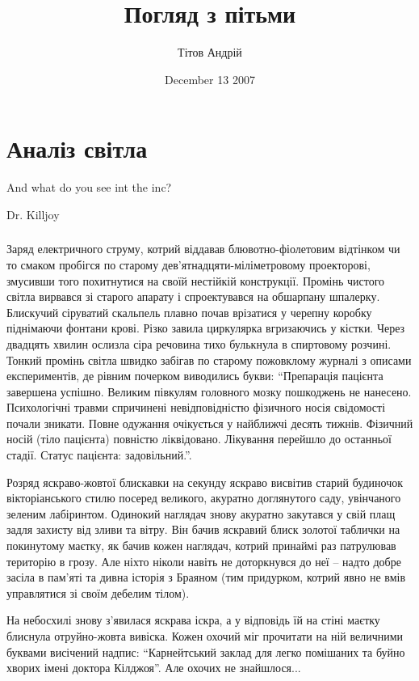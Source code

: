 \documentclass[a4paper,oneside]{book}
\begin{document}
\title{Погляд з пітьми}
\author{Тітов Андрій}
\date{December 13 2007}
\maketitle

\tableofcontents

\part{Аналіз світла}
\setcounter{chapter}{1}

\epigraph{And what do you see int the inc?}{Dr. Killjoy}

\section*{}

Заряд електричного струму, котрий віддавав блювотно-фіолетовим відтінком чи то
смаком пробігся по старому дев'ятнадцяти-міліметровому проекторові, змусивши
того похитнутися на своїй нестійкій конструкції. Промінь чистого світла
вирвався зі старого апарату і спроектувався  на обшарпану шпалерку. Блискучий
сіруватий скальпель плавно почав врізатися у черепну коробку піднімаючи
фонтани крові. Різко завила циркулярка вгризаючись у кістки. Через двадцять
хвилин ослизла сіра речовина тихо булькнула в спиртовому розчині. Тонкий
промінь світла швидко забігав по старому пожовклому журналі з описами
експериментів, де рівним почерком виводились букви: “Препарація пацієнта
завершена успішно. Великим півкулям головного мозку пошкоджень не
нанесено. Психологічні травми спричинені невідповідністю фізичного носія
свідомості почали зникати. Повне одужання очікується у найближчі десять
тижнів. Фізичний носій (тіло пацієнта) повністю ліквідовано. Лікування
перейшло до останньої стадії. Статус пацієнта: задовільний.”.

Розряд яскраво-жовтої блискавки на секунду яскраво висвітив старий будиночок
вікторіанського стилю посеред великого, акуратно доглянутого саду, увінчаного
зеленим лабіринтом. Одинокий наглядач знову акуратно закутався у свій плащ
задля захисту від зливи та вітру. Він бачив яскравий блиск золотої таблички на
покинутому маєтку, як бачив кожен наглядач, котрий принаймі раз патрулював
територію в грозу. Але ніхто ніколи навіть не доторкнувся до неї – надто добре
засіла в пам'яті та дивна історія з Браяном (тим придурком, котрий явно не
вмів управлятися зі своїм дебелим тілом).

На небосхилі знову з’явилася яскрава іскра, а у відповідь їй на стіні маєтку
блиснула отруйно-жовта вивіска. Кожен охочий міг прочитати на ній величними
буквами висічений надпис: “Карнейтський заклад для легко помішаних та буйно
хворих імені доктора Кілджоя”. Але охочих не знайшлося...
\end{document}

